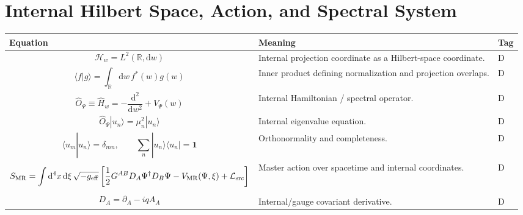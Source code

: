 \documentclass[11pt]{article}
\newcommand{\MR}{\mathrm{MR}}
\newcommand{\eff}{\mathrm{eff}}
\newcommand{\dd}{\mathrm{d}}
\begin{document}
\section{Internal Hilbert Space, Action, and Spectral System}
\begin{longtable}{>{\raggedright\arraybackslash}p{} >{\raggedright\arraybackslash}p{} >{\centering\arraybackslash}p{}}
\toprule
\textbf{Equation} & \textbf{Meaning} & \textbf{Tag} \\
\midrule
\endhead

\begin{equation}
\mathcal H_w=L^2(\mathbb R,\dd w)
\end{equation}
& Internal projection coordinate as a Hilbert-space coordinate. & D \\

\begin{equation}
\langle f|g\rangle=\int_{\mathbb R}\dd w\,f^*(w)g(w)
\end{equation}
& Inner product defining normalization and projection overlaps. & D \\

\begin{equation}
\hat O_\Psi\equiv \hat H_w=-\frac{\dd^2}{\dd w^2}+V_\Psi(w)
\end{equation}
& Internal Hamiltonian / spectral operator. & D \\

\begin{equation}
\hat O_\Psi |u_n\rangle=\mu_n^2|u_n\rangle
\end{equation}
& Internal eigenvalue equation. & D \\

\begin{equation}
\langle u_m|u_n\rangle=\delta_{mn},\qquad
\sum_n |u_n\rangle\langle u_n|=\mathbf 1
\end{equation}
& Orthonormality and completeness. & D \\

\begin{equation}
S_{\MR}=\int \dd^4x\,\dd\xi\,\sqrt{-g_{\eff}}
\left[\frac12G^{AB}D_A\Psi^\dagger D_B\Psi-V_{\MR}(\Psi,\xi)+\mathcal L_{\rm src}\right]
\end{equation}
& Master action over spacetime and internal coordinates. & D \\

\begin{equation}
D_A=\partial_A-iqA_A
\end{equation}
& Internal/gauge covariant derivative. & D \\


\end{longtable}
\end{document}
